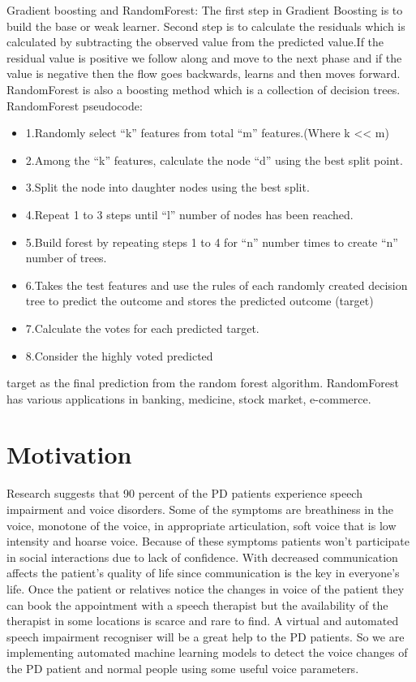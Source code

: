 \documentclass[conference]{IEEEtran}
\begin{document}
Gradient boosting and RandomForest:
The first step in Gradient Boosting is to build the base or weak learner. Second step is to calculate the residuals which is  calculated by subtracting the observed value from the predicted value.If the residual value is positive we follow along and move to the next phase and if the value is negative then the flow goes backwards, learns and then moves forward.
RandomForest is also a boosting method which is a collection of decision trees.
RandomForest pseudocode:
\begin{itemize}
    \item 1.Randomly select “k” features from total “m” features.(Where k << m)
    \item 2.Among the “k” features, calculate the node “d” using the best split point.
    \item 3.Split the node into daughter nodes using the best split.
    \item 4.Repeat 1 to 3 steps until “l” number of nodes has been reached.
    \item 5.Build forest by repeating steps 1 to 4 for “n” number times to create “n” number of trees.
    \item 6.Takes the test features and use the rules of each randomly created decision tree to predict the outcome and stores the predicted outcome (target)
    \item 7.Calculate the votes for each predicted target.
    \item 8.Consider the highly voted predicted
\end{itemize}





 target as the final prediction from the random forest algorithm.
RandomForest has various applications in banking, medicine, stock market, e-commerce.




\section{Motivation}
Research suggests that 90 percent of the PD patients experience speech impairment and voice disorders. Some of the symptoms are breathiness in the voice, monotone of the voice, in appropriate articulation, soft voice that is low intensity and hoarse voice. Because of these symptoms patients won’t participate in social interactions due to lack of confidence. With decreased communication affects the patient's quality of life since communication is the key in everyone’s life. Once the patient or relatives notice the changes in voice of the patient they can book the appointment with a speech therapist but the availability of the therapist in some locations is scarce and rare to find. A virtual and automated speech impairment recogniser will be a great help to the PD patients.
So  we are implementing automated machine learning models to detect the voice changes of the PD patient and normal people using some useful voice parameters.
\end{document}
